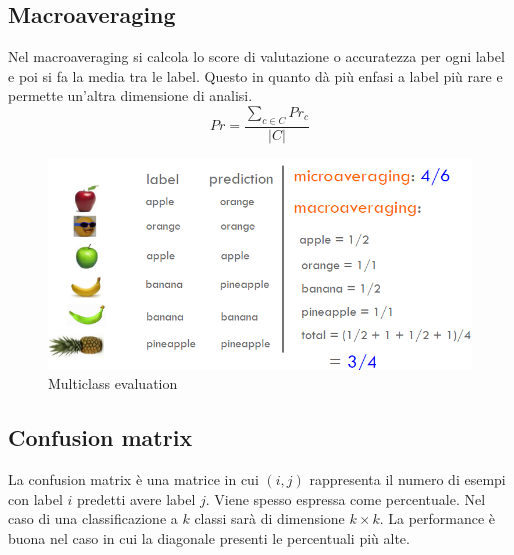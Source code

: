 	\subsection{Macroaveraging}
	Nel macroaveraging si calcola lo score di valutazione o accuratezza per ogni label e poi si fa la media tra le label.
	Questo in quanto d\`a pi\`u enfasi a label pi\`u rare e permette un'altra dimensione di analisi.
	$$Pr=\dfrac{\sum\limits_{c\in C}Pr_c}{|C|}$$
	
	\begin{figure}
		\centering
		\includegraphics[width=0.6\linewidth]{imgs/chapter6/img4}
		\caption{Multiclass evaluation}
		\label{fig:chapter06-04}
	\end{figure}
	
	\subsection{Confusion matrix}
	La confusion matrix \`e una matrice in cui $(i, j)$ rappresenta il numero di esempi con label $i$ predetti avere label $j$.
	Viene spesso espressa come percentuale.
	Nel caso di una classificazione a $k$ classi sar\`a di dimensione $k\times k$.
	La performance \`e buona nel caso in cui la diagonale presenti le percentuali pi\`u alte.
